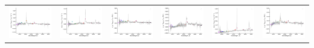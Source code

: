 \begin{center}
\begin{longtable}{l l l l l l }
    \includegraphics[width=0.3\linewidth, clip]{Figs/Figs-sdss/spec-4206-55471-0352-STRIPE82-0147-043690.pdf} & \includegraphics[width=0.3\linewidth, clip]{Figs/Figs-sdss/spec-4217-55478-0338-STRIPE82-0003-028018.pdf} & \includegraphics[width=0.3\linewidth, clip]{Figs/Figs-sdss/spec-4217-55478-0796-STRIPE82-0004-029068.pdf} & \includegraphics[width=0.3\linewidth, clip]{Figs/Figs-sdss/spec-4219-55480-0333-STRIPE82-0009-033328.pdf} & \includegraphics[width=0.3\linewidth, clip]{Figs/Figs-sdss/spec-4234-55478-0651-STRIPE82-0044-019857.pdf} & \includegraphics[width=0.3\linewidth, clip]{Figs/Figs-sdss/spec-4236-55479-0206-STRIPE82-0049-010030.pdf} \\

\end{longtable}
\end{center}
